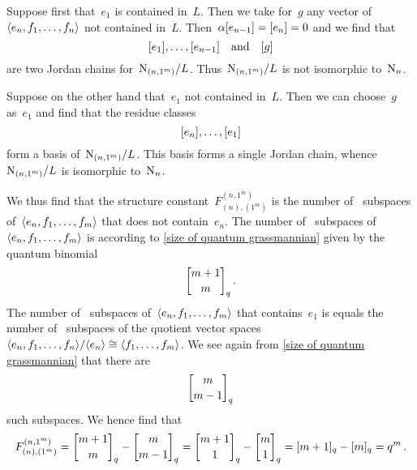 \documentclass[a4paper, 11pt, twoside=semi]{scrartcl}
\begin{document}
Suppose first that~$e_1$ is contained in~$L$.
Then we take for~$g$ any vector of~$\langle e_n, f_1, \dotsc, f_n\rangle$ not contained in~$L$.
Then~$\alpha [e_{n-1}] = [e_n] = 0$ and we find that
\[
  [e_1], \dotsc, [e_{n-1}]
  \quad
  \text{and}
  \quad
  [g]
\]
are two Jordan chains for~$\mathrm{N}_{(n, 1^m)} / L$.
Thus~$\mathrm{N}_{(n, 1^m)} / L$ is not isomorphic to~$\mathrm{N}_n$.

Suppose on the other hand that~$e_1$ not contained in~$L$.
Then we can choose~$g$ as~$e_1$ and find that the residue classes
\[
  [e_n], \dotsc, [e_1]
\]
form a basis of~$\mathrm{N}_{(n, 1^m)} / L$.
This basis forms a single Jordan chain, whence~$\mathrm{N}_{(n, 1^m)} / L$ is isomorphic to~$\mathrm{N}_n$.

We thus find that the structure constant~$F^{(n, 1^m)}_{(n), (1^m)}$ is the number of~ subspaces of~$\langle e_n, f_1, \dotsc, f_m\rangle$ that does not contain~$e_n$.
The number of~ subspaces of~$\langle e_n, f_1, \dotsc, f_m\rangle$ is according to \cref{size of quantum grassmannian} given by the quantum binomial
\[
  \qbinom{m+1}{m}_q \,.
\]
The number of~ subspaces of~$\langle e_n, f_1, \dotsc, f_m\rangle$ that contains~$e_1$ is equals the number of~ subspaces of the quotient vector spaces~$\langle e_n, f_1, \dotsc, f_n\rangle / \langle e_n\rangle \cong \langle f_1, \dotsc, f_m\rangle$.
We see again from \cref{size of quantum grassmannian} that there are
\[
  \qbinom{m}{m-1}_q
\]
such subspaces.
We hence find that
\[
  F^{(n, 1^m)}_{(n), (1^m)}
  =
  \qbinom{m+1}{m}_q - \qbinom{m}{m-1}_q
  =
  \qbinom{m+1}{1}_q - \qbinom{m}{1}_q
  =
  \qnum{m+1}_q - \qnum{m}_q
  =
  q^m \,.
\]


%
%
\end{document}
